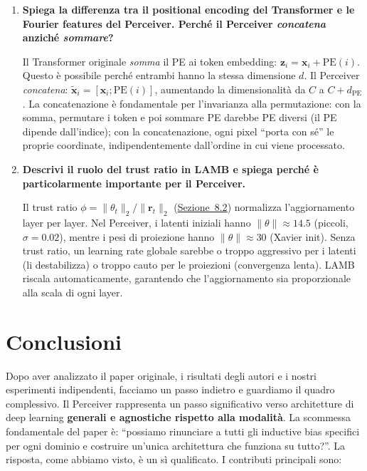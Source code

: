 \documentclass[12pt,a4paper]{article}
\begin{document}
\begin{enumerate}[resume, label=\textbf{D\arabic*.}]
\item \textbf{Spiega la differenza tra il positional encoding del Transformer e le Fourier features del Perceiver. Perch\'e il Perceiver \emph{concatena} anzich\'e \emph{sommare}?}

\begin{proofbox}
Il Transformer originale \emph{somma} il PE ai token embedding: $\mathbf{z}_i = \mathbf{x}_i + \text{PE}(i)$. Questo \`e possibile perch\'e entrambi hanno la stessa dimensione $d$. Il Perceiver \emph{concatena}: $\tilde{\mathbf{x}}_i = [\mathbf{x}_i; \text{PE}(i)]$, aumentando la dimensionalit\`a da $C$ a $C + d_{\text{PE}}$. La concatenazione \`e fondamentale per l'invarianza alla permutazione: con la somma, permutare i token e poi sommare PE darebbe PE diversi (il PE dipende dall'indice); con la concatenazione, ogni pixel ``porta con s\'e'' le proprie coordinate, indipendentemente dall'ordine in cui viene processato.
\end{proofbox}

\item \textbf{Descrivi il ruolo del trust ratio in LAMB e spiega perch\'e \`e particolarmente importante per il Perceiver.}

\begin{proofbox}
Il trust ratio $\phi = \|\theta_t\|_2 / \|\mathbf{r}_t\|_2$ (\hyperref[sec:ottimizzatori]{Sezione~8.2}) normalizza l'aggiornamento layer per layer. Nel Perceiver, i latenti iniziali hanno $\|\theta\| \approx 14.5$ (piccoli, $\sigma = 0.02$), mentre i pesi di proiezione hanno $\|\theta\| \approx 30$ (Xavier init). Senza trust ratio, un learning rate globale sarebbe o troppo aggressivo per i latenti (li destabilizza) o troppo cauto per le proiezioni (convergenza lenta). LAMB riscala automaticamente, garantendo che l'aggiornamento sia proporzionale alla scala di ogni layer.
\end{proofbox}

\end{enumerate}


\newpage
\section{Conclusioni} \label{sec:conclusioni}

Dopo aver analizzato il paper originale, i risultati degli autori e i nostri esperimenti indipendenti, facciamo un passo indietro e guardiamo il quadro complessivo. Il Perceiver rappresenta un passo significativo verso architetture di deep learning \textbf{generali e agnostiche rispetto alla modalit\`a}. La scommessa fondamentale del paper \`e: ``possiamo rinunciare a tutti gli inductive bias specifici per ogni dominio e costruire un'unica architettura che funziona su tutto?''. La risposta, come abbiamo visto, \`e un s\`i qualificato. I contributi principali sono:
\end{document}
